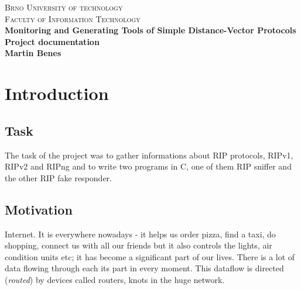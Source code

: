 \documentclass[10pt,a4paper,titlepage]{article}
\begin{document}
    

    \begin{titlepage}
    \begin{center}
        \textsc{\LARGE Brno University of technology}\\[0.5cm]
        \textsc{\large Faculty of Information Technology}\\[8cm]
    
        { \huge \bfseries Monitoring and Generating Tools of Simple Distance-Vector Protocols}\\[0.3cm]
        { \Large \bfseries Project documentation}\\[0.5cm]
        { \bfseries Martin Benes}\\
    
    \end{center} 
    \end{titlepage}
    \newpage
    

    \tableofcontents
    \newpage





    \section{Introduction}
        \subsection{Task}
            The task of the project was to gather informations about RIP protocols, RIPv1, RIPv2 and RIPng and
            to write two programs in C, one of them RIP sniffer and the other RIP fake responder.

        \subsection{Motivation}
            Internet. It is everywhere nowadays - it helps us order pizza, find a taxi, do shopping,
            connect us with all our friends but it also controls the lights, air condition units etc;
            it has become a significant part of our lives. There is a lot of data flowing through each
            its part in every moment. This dataflow is directed ({\it routed}) by devices called routers,
            knots in the huge network.
\end{document}

